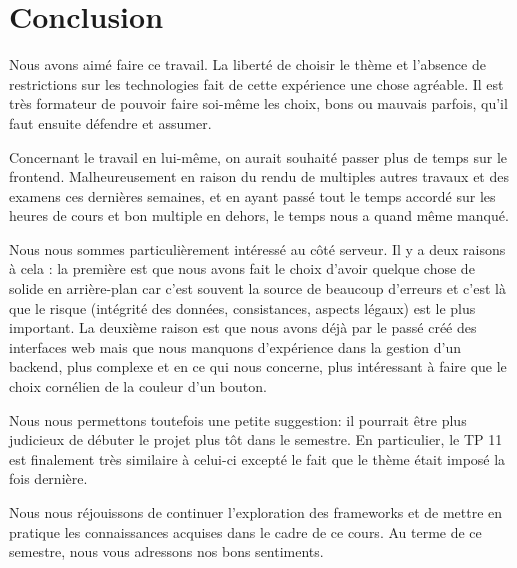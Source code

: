
\section*{Conclusion}
Nous avons aimé faire ce travail. La liberté de choisir le thème et l'absence de restrictions sur les technologies 
fait de cette expérience une chose agréable. Il est très formateur de pouvoir faire soi-même les choix, 
bons ou mauvais parfois, qu'il faut ensuite défendre et assumer.

Concernant le travail en lui-même, on aurait souhaité passer plus de temps sur le frontend. Malheureusement 
en raison du rendu de multiples autres travaux et des examens ces dernières semaines, et en ayant passé tout 
le temps accordé sur les heures de cours et bon multiple en dehors, le temps nous a quand même manqué.

Nous nous sommes particulièrement intéressé au côté serveur. Il y a deux raisons à cela : la première est que nous avons fait le choix d'avoir quelque chose de solide en arrière-plan car c'est souvent la source de beaucoup d'erreurs et
c'est là que le risque (intégrité des données, consistances, aspects légaux) est le plus important. 
La deuxième raison est que nous avons déjà par le passé créé des interfaces web mais que nous manquons
d'expérience dans la gestion d'un backend, plus complexe et en ce qui nous concerne, plus intéressant à faire
que le choix cornélien de la couleur d'un bouton.

Nous nous permettons toutefois une petite suggestion: il pourrait être plus judicieux de débuter le projet
plus tôt dans le semestre. En particulier, le TP 11 est finalement très similaire à celui-ci excepté le fait
que le thème était imposé la fois dernière.

Nous nous réjouissons de continuer l'exploration des frameworks et de mettre en pratique les connaissances
acquises dans le cadre de ce cours. Au terme de ce semestre, nous vous adressons nos bons sentiments.
